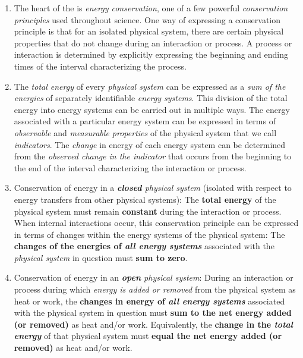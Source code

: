 \parbox[c]{\rightcolumn}{
	\begin{enumerate}
		\item The heart of the \EnergyInteractionModel{} is \emph{energy conservation}, one of a few powerful \emph{conservation principles} used throughout science. One way of expressing a conservation principle is that for an isolated physical system, there are certain physical properties that do not change during an interaction or process. A process or interaction is determined by explicitly expressing the beginning and ending times of the interval characterizing the process.
		
		\item The \emph{total energy} of every \emph{physical system} can be expressed as a \emph{sum of the energies} of separately identifiable \emph{energy systems}. This division of the total energy into energy systems can be carried out in multiple ways. The energy associated with a particular energy system can be expressed in terms of \emph{observable} and \emph{measurable properties} of the physical system that we call \emph{indicators}. The \emph{change} in energy of each energy system can be determined from the \emph{observed change in the indicator} that occurs from the beginning to the end of the interval characterizing the interaction or process.
		
		\item Conservation of energy in a \emph{\textbf{closed} physical system} (isolated with respect to energy transfers from other physical systems): The \textbf{total energy} of the physical system must remain \textbf{constant} during the interaction or process. When internal interactions occur, this conservation principle can be expressed in terms of changes within the energy systems of the physical system: The \textbf{changes of the energies of \emph{all energy systems}} associated with the \emph{physical system} in question must \textbf{sum to zero}.
		
		\item Conservation of energy in an \emph{\textbf{open} physical system}: During an interaction or process during which \emph{energy is added or removed} from the physical system as heat or work, the \textbf{changes in energy of {\em all energy systems}} associated with the physical system in question must \textbf{sum to the net energy added (or removed)} as heat and/or work. Equivalently, the \textbf{change in the {\em total energy}} of that physical system must \textbf{equal the net energy added (or removed)} as heat and/or work.
	\end{enumerate}
}
	
